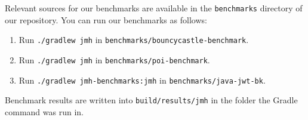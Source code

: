 \documentclass[parskip=full]{scrreprt}
\begin{document}
Relevant sources for our benchmarks are available in the \texttt{benchmarks} directory of our repository.
You can run our benchmarks as follows:

\begin{enumerate}
 \item Run \texttt{./gradlew jmh} in \texttt{benchmarks/bouncycastle-benchmark}.
 \item Run \texttt{./gradlew jmh} in \texttt{benchmarks/poi-benchmark}.
 \item Run \texttt{./gradlew jmh-benchmarks:jmh} in \texttt{benchmarks/java-jwt-bk}.
\end{enumerate}

Benchmark results are written into \texttt{build/results/jmh} in the folder the Gradle command was run in.
\end{document}
